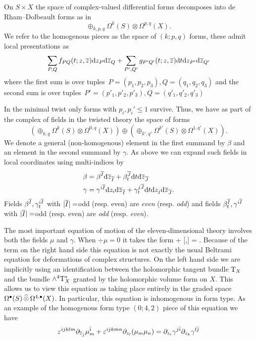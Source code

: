 On $S \times X$ the space of complex-valued differential forms decomposes into de Rham--Dolbeault forms as in
\[
\oplus_{k,p,q} \Omega^k(S) \otimes \Omega^{p,q}(X) .
\]
We refer to the homogenous pieces as the space of $(k;p,q)$ forms, these admit local presentations as
\[
\sum_{P,Q} f_{PQ} (t;z,\zbar) \d z_P \d \zbar_Q + \sum_{P',Q'} g_{P'Q'}(t;z,\zbar) \d t \d z_{P'}\d \zbar_{Q'} 
\]
where the first sum is over tuples~$P=(p_1,p_2,p_3),Q=(q_1,q_2,q_3)$ and
the second sum is over tuples~$P'=(p'_1,p'_2,p'_3),Q=(q'_1,q'_2,q'_3)$

In the minimal twist only forms with $p_i ,p_i'\leq 1$ survive. 
Thus, we have as part of the complex of fields in the twisted theory the space of forms
\[
\left(\oplus_{k,q} \Omega^k(S) \otimes \Omega^{0,q}(X)\right) \oplus 
\left(\oplus_{k',q'} \Omega^{k'}(S) \otimes \Omega^{1,q'}(X)\right) .
\]
We denote a general (non-homogenous) element in the first summand by $\beta$ and an element in the second summand by $\gamma$.
As above we can expand such fields in local coordinates using multi-indices by 
\begin{align*}
\beta & = \beta^{\Bar{I}} \d \zbar_{\Bar{I}} + \beta_t^{\Bar{J}} \d t \d \zbar_{\Bar{J}}\\
\gamma & = \gamma^{i \Bar{I}} \d z_i \d \zbar_{\Bar{I}} + \gamma_t^{j \Bar{J}} \d t \d z_j \d \zbar_{\Bar{J}}.
\end{align*}
Fields $\beta^{\Bar{I}}, \gamma_t^{i \Bar{I}}$ with $|\Bar{I}| = $odd (resp. even) are {\em even} (resp. {\em odd}) and fields $\beta_t^{\Bar{I}}, \gamma^{i \Bar{I}}$ with $|\Bar{I}| = $odd (resp. even) are {\em odd} (resp. {\em even}). 

The most important equation of motion of the eleven-dimensional theory involves both the fields $\mu$ and $\gamma$. 
When $\div \mu = 0$ it takes the form
\beqn\label{eqn:eom2}
\dbar \mu +  [\mu,\mu] = \del \gamma \del \gamma .
\eeqn
Because of the term on the right hand side this equation is not exactly the usual Beltrami equation for deformations of complex structures.
On the left hand side we are implicitly using an identification between the holomorphic tangent bundle $\T_X$ and the bundle $\wedge^4 \T^*_X$ granted by the holomorphic volume form on $X$.
This allows us to view this equation as taking place entirely in the graded space $\Omega^\bu(S) \hotimes \Omega^{4,\bu}(X)$. 
In particular, this equation is inhomogenous in form type.
As an example of the homogenous form type $(0;4,2)$ piece of this equation we have 
\[
\ep^{ijklm} \del_{\zbar_{\bar{j}}} \mu_m^{\bar{i}} + \ep^{ijkmn} \del_{z_l} (\mu_{m} \mu_{n}) =\del_{z_i} \gamma^{j \bar{i}} \del_{z_k} \gamma^{l \bar{j}} 
\]

